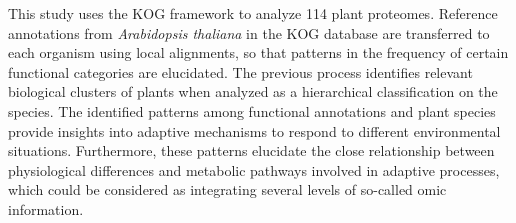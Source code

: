 This study uses the KOG framework to analyze 114 plant 
proteomes. 
Reference annotations from \emph{Arabidopsis 
thaliana} in the KOG database are transferred to each 
organism using local alignments, so that patterns in the 
frequency of certain functional categories are elucidated.
The previous process identifies relevant biological clusters of 
plants when analyzed as a hierarchical classification on 
the species.
The identified patterns among functional annotations and 
plant species provide insights into adaptive 
mechanisms to respond to different environmental 
situations. Furthermore, these patterns elucidate the close 
relationship between physiological differences and metabolic 
pathways involved in adaptive processes, which could be 
considered as integrating several levels of so-called 
omic information.
